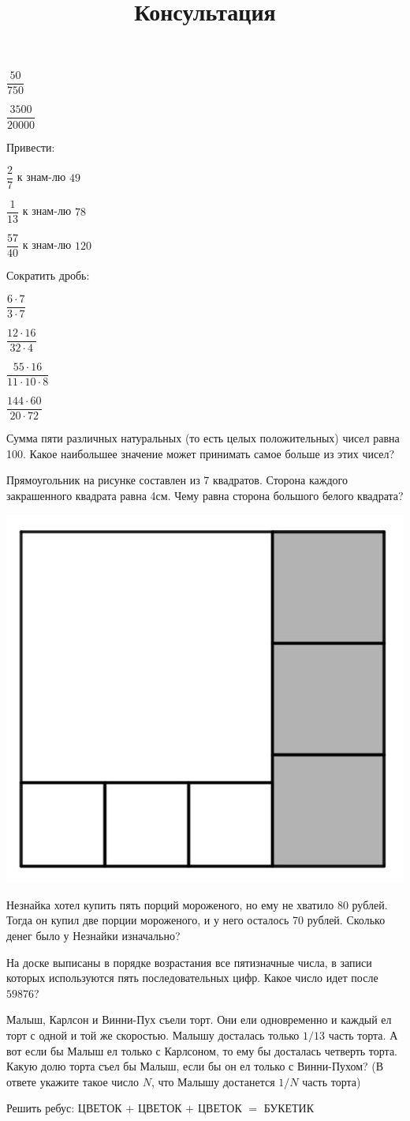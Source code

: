\begin{listofex}
\begin{enumcols}[itemcolumns=5]
		\item \( \dfrac{50}{750} \)
		\item \( \dfrac{3500}{20000} \)
	\end{enumcols}
	\item Привести:
	\begin{enumcols}[itemcolumns=3]
		\item \( \dfrac{2}{7} \) к знам-лю \( 49 \)
		\item \( \dfrac{1}{13} \) к знам-лю \( 78 \)
		\item \( \dfrac{57}{40} \) к знам-лю \( 120 \)
	\end{enumcols}
	\item Сократить дробь:
	\begin{enumcols}[itemcolumns=4]
		\item \( \dfrac{6\cdot7}{3\cdot7} \)
		\item \( \dfrac{12\cdot16}{32\cdot4} \)
		\item \( \dfrac{55\cdot16}{11\cdot10\cdot8} \)
		\item \( \dfrac{144\cdot60}{20\cdot72} \)
	\end{enumcols}
\end{listofex}
\newpage
\title{Консультация}
\begin{listofex}
	\item Сумма пяти различных натуральных (то есть целых положительных) чисел равна 100. Какое
	наибольшее значение может принимать самое больше из этих чисел?
	\item Прямоугольник на рисунке составлен из 7 квадратов. Сторона каждого закрашенного квадрата
	равна 4см. Чему равна сторона большого белого квадрата?
	\begin{center}
		\includegraphics[width=0.3\linewidth]{124.jpg}
	\end{center}
	\item Незнайка хотел купить пять порций мороженого, но ему не хватило 80 рублей. Тогда он купил две порции мороженого, и у него осталось 70 рублей. Сколько денег было у Незнайки изначально?
	\item На доске выписаны в порядке возрастания все пятизначные числа, в записи которых используются
	пять последовательных цифр. Какое число идет после \( 59876 \)?
	\item Малыш, Карлсон и Винни-Пух съели торт. Они ели одновременно и каждый ел торт с одной и
	той же скоростью. Малышу досталась только \( 1/13 \) часть торта. А вот если бы Малыш ел только с Карлсоном, то ему бы досталась четверть торта. Какую долю торта съел бы Малыш, если бы он ел только с Винни-Пухом? (В ответе укажите такое число \( N \), что Малышу достанется \( 1/N \) часть торта)

	\item Решить ребус: ЦВЕТОК \( + \) ЦВЕТОК \( + \) ЦВЕТОК \( = \) БУКЕТИК
\end{listofex}
